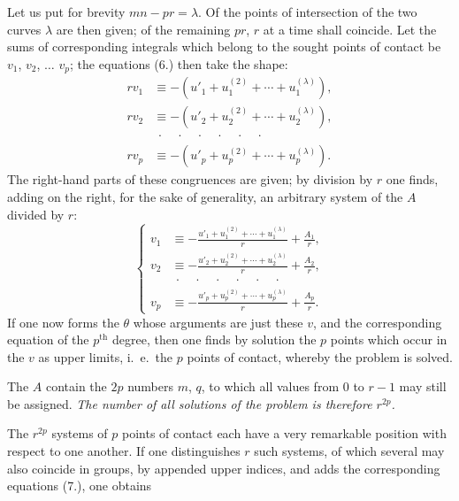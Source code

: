 \documentclass{article}
\begin{document}
Let us put for brevity $mn - pr = \lambda$. Of the points of intersection of the two curves $\lambda$ are then given; of the remaining $pr$, $r$ at a time shall coincide. Let the sums of corresponding integrals which belong to the sought points of contact be $v_{1}$, $v_{2}$, $\ldots$ $v_{p}$; the equations (6.) then take the shape:
\[
\begin{aligned}
rv_{1} &\equiv -(u'_{1} + u_{1}^{(2)} + \cdots + u_{1}^{(\lambda)}), \\
rv_{2} &\equiv -(u'_{2} + u_{2}^{(2)} + \cdots + u_{2}^{(\lambda)}), \\
&\ \cdot\quad\cdot\quad\cdot\quad\cdot\quad\cdot\quad\cdot \\
rv_{p} &\equiv -(u'_{p} + u_{p}^{(2)} + \cdots + u_{p}^{(\lambda)}).
\end{aligned}
\]
The right-hand parts of these congruences are given; by division by $r$ one finds, adding on the right, for the sake of generality, an arbitrary system of the $A$ divided by $r$:
\[
\left\{
\begin{aligned}
v_{1} &\equiv -\frac{u'_{1} + u_{1}^{(2)} + \cdots + u_{1}^{(\lambda)}}{r} + \frac{A_{1}}{r}, \\
v_{2} &\equiv -\frac{u'_{2} + u_{2}^{(2)} + \cdots + u_{2}^{(\lambda)}}{r} + \frac{A_{2}}{r}, \\
&\ \cdot\quad\cdot\quad\cdot\quad\cdot\quad\cdot\quad\cdot \\
v_{p} &\equiv -\frac{u'_{p} + u_{p}^{(2)} + \cdots + u_{p}^{(\lambda)}}{r} + \frac{A_{p}}{r}.
\end{aligned}
\right.
\tag{7.}
\]
If one now forms the $\theta$ whose arguments are just these $v$, and the corresponding equation of the $p^{\text{th}}$ degree, then one finds by solution the $p$ points which occur in the $v$ as upper limits, i.\ e.\ the $p$ points of contact, whereby the problem is solved.

The $A$ contain the $2p$ numbers $m$, $q$, to which all values from 0 to $r-1$ may still be assigned. \emph{The number of all solutions of the problem is therefore $r^{2p}$.}

The $r^{2p}$ systems of $p$ points of contact each have a very remarkable position with respect to one another. If one distinguishes $r$ such systems, of which several may also coincide in groups, by appended upper indices, and adds the corresponding equations (7.), one obtains
\end{document}
